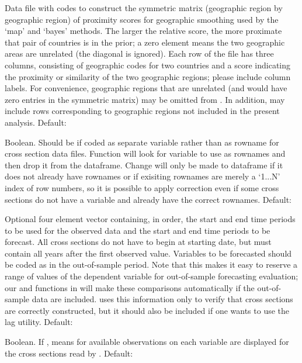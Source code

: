 \begin{Arguments}
\begin{ldescription}
\item[\code{proximity}] Data file with codes to construct the symmetric
matrix (geographic region by geographic region) of proximity
scores for geographic smoothing used by the `map' and `bayes'
methods. The larger the relative score, the more proximate
that pair of countries is in the prior; a zero element means
the two geographic areas are unrelated (the diagonal is
ignored).  Each row of the  file has three
columns, consisting of geographic codes for two countries
and a score indicating the proximity or similarity of the
two geographic regions; please include column labels. For
convenience, geographic regions that are unrelated (and
would have zero entries in the symmetric matrix) may be
omitted from . In addition, 
may include rows corresponding to geographic regions not
included in the present analysis. Default: 

\item[\code{year.var}] Boolean. Should be  if  coded as
separate variable rather than as rowname for cross section
data files.  Function will look for  variable to
use as rownames and then drop it from the dataframe. Change
will only be made to dataframe if it does not already have
rownames or if exisiting rownames are merely a
`1...N' index of row numbers, so it is possible to
apply correction even if some cross sections do not have a
 variable and already have the correct
rownames. Default: 

\item[\code{sample.frame}] Optional four element vector containing, in order,
the start and end time periods to be used for the observed
data and the start and end time periods to be forecast. All
cross sections do not have to begin at starting date, but
must contain all years after the first observed
value. Variables to be forecasted should be coded as
 in the out-of-sample period. Note that this makes
it easy to reserve a range of values of the dependent
variable for out-of-sample forecasting evaluation; our
 and  functions in
 will make these comparisons
automatically if the out-of-sample data are
included.  uses this information only to
verify that cross sections are correctly
constructed, but it should also be included if one wants to
use the lag utility. Default: 

\item[\code{summary}] Boolean. If , means for available
observations on each variable are displayed for the cross
sections read by . Default: 


\end{ldescription}
\end{Arguments}

